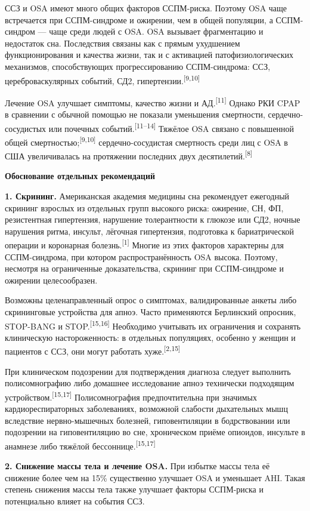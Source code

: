 \documentclass[11pt,a4paper]{article}
\newcommand{\src}[1]{\textsuperscript{[#1]}}
\newcommand{\heading}[1]{\par\medskip\textbf{#1}\par}
\begin{document}
ССЗ и OSA имеют много общих факторов ССПМ-риска. Поэтому OSA чаще встречается при ССПМ-синдроме и ожирении, чем в общей популяции, а ССПМ-синдром --- чаще среди людей с OSA. OSA вызывает фрагментацию и недостаток сна. Последствия связаны как с прямым ухудшением функционирования и качества жизни, так и с активацией патофизиологических механизмов, способствующих прогрессированию ССПМ-синдрома: ССЗ, цереброваскулярных событий, СД2, гипертензии.\src{9,10}

Лечение OSA улучшает симптомы, качество жизни и АД.\src{11} Однако РКИ CPAP в сравнении с обычной помощью не показали уменьшения смертности, сердечно-сосудистых или почечных событий.\src{11--14} Тяжёлое OSA связано с повышенной общей смертностью;\src{9,10} сердечно-сосудистая смертность среди лиц с OSA в США увеличивалась на протяжении последних двух десятилетий.\src{8}

\heading{Обоснование отдельных рекомендаций}
\textbf{1. Скрининг.} Американская академия медицины сна рекомендует ежегодный скрининг взрослых из отдельных групп высокого риска: ожирение, СН, ФП, резистентная гипертензия, нарушение толерантности к глюкозе или СД2, ночные нарушения ритма, инсульт, лёгочная гипертензия, подготовка к бариатрической операции и коронарная болезнь.\src{1} Многие из этих факторов характерны для ССПМ-синдрома, при котором распространённость OSA высока. Поэтому, несмотря на ограниченные доказательства, скрининг при ССПМ-синдроме и ожирении целесообразен.

Возможны целенаправленный опрос о симптомах, валидированные анкеты либо скрининговые устройства для апноэ. Часто применяются Берлинский опросник, STOP-BANG и STOP.\src{15,16} Необходимо учитывать их ограничения и сохранять клиническую настороженность: в отдельных популяциях, особенно у женщин и пациентов с ССЗ, они могут работать хуже.\src{2,15}

При клиническом подозрении для подтверждения диагноза следует выполнить полисомнографию либо домашнее исследование апноэ технически подходящим устройством.\src{15,17} Полисомнография предпочтительна при значимых кардиореспираторных заболеваниях, возможной слабости дыхательных мышц вследствие нервно-мышечных болезней, гиповентиляции в бодрствовании или подозрении на гиповентиляцию во сне, хроническом приёме опиоидов, инсульте в анамнезе либо тяжёлой бессоннице.\src{15,17}

\textbf{2. Снижение массы тела и лечение OSA.} При избытке массы тела её снижение более чем на 15\% существенно улучшает OSA и уменьшает AHI. Такая степень снижения массы тела также улучшает факторы ССПМ-риска и потенциально влияет на события ССЗ.
\end{document}
